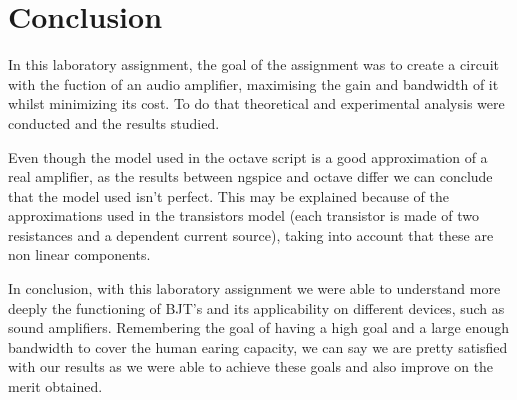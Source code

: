 \section{Conclusion}
\label{sec:conclusion}

\par In this laboratory assignment, the goal of the assignment was to create a circuit with the fuction of an audio amplifier, maximising the gain and bandwidth of it whilst minimizing its cost. To do that theoretical and experimental analysis were conducted and the results studied.

\par Even though the model used in the octave script is a good approximation of a real amplifier, as the results between ngspice and octave differ  we can conclude that the model used isn't perfect. This may be explained because of the approximations used in the transistors model (each transistor is made of two resistances and a dependent current source), taking into account that these are non linear components. 
 
\par In conclusion, with this laboratory assignment we were able to understand more deeply the functioning of BJT's and its applicability on different devices, such as sound amplifiers. Remembering the goal of having a high goal and a large enough bandwidth to cover the human earing capacity, we can say we are pretty satisfied with our results as we were able to achieve these goals and also improve on the merit obtained.







